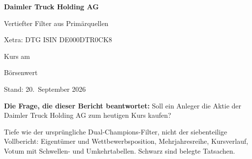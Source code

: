 \begin{titlepage}
\centering
\vspace*{3cm}
{\Huge\bfseries Daimler Truck Holding AG\par}
\vspace{0.8cm}
{\Large Vertiefter Filter aus Prim\"arquellen\par}
\vspace{0.4cm}
{\large Xetra: DTG \textbar{} ISIN DE000DTR0CK8\par}
\vspace{2.5cm}
{\large Kurs  am \KursDatum\par}
\vspace{0.3cm}
{\large B\"orsenwert \par}
\vspace{3cm}
{\large Stand: 20.~September 2026\par}
\vspace{1cm}
\begin{minipage}{0.86\linewidth}\small
\textbf{Die Frage, die dieser Bericht beantwortet:} Soll ein Anleger die Aktie der
Daimler Truck Holding AG zum heutigen Kurs kaufen?

\medskip
Tiefe wie der urspr\"ungliche Dual-Champions-Filter, nicht der siebenteilige
Vollbericht: Eigent\"umer und Wettbewerbsposition, Mehrjahresreihe, Kursverlauf, Votum
mit Schwellen- und Umkehrtabellen. Schwarz sind belegte Tatsachen.  
\end{minipage}
\end{titlepage}
